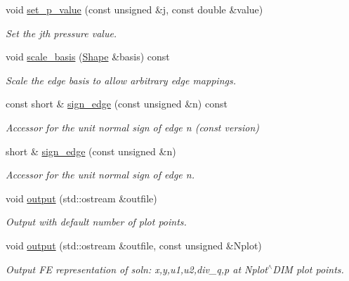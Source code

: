 \begin{DoxyCompactItemize}
void \hyperlink{classoomph_1_1TAxisymmetricPoroelasticityElement_a8156a72c0ba1887945532e528ff5173a}{set\+\_\+p\+\_\+value} (const unsigned \&j, const double \&value)
\begin{DoxyCompactList}\small\item\em Set the jth pressure value. \end{DoxyCompactList}\item 
void \hyperlink{classoomph_1_1TAxisymmetricPoroelasticityElement_ad06425b96b50c62a9e006ca7877cbb95}{scale\+\_\+basis} (\hyperlink{classoomph_1_1Shape}{Shape} \&basis) const
\begin{DoxyCompactList}\small\item\em Scale the edge basis to allow arbitrary edge mappings. \end{DoxyCompactList}\item 
const short \& \hyperlink{classoomph_1_1TAxisymmetricPoroelasticityElement_aa78f2091846d6ec114e2a75631b512d4}{sign\+\_\+edge} (const unsigned \&n) const
\begin{DoxyCompactList}\small\item\em Accessor for the unit normal sign of edge n (const version) \end{DoxyCompactList}\item 
short \& \hyperlink{classoomph_1_1TAxisymmetricPoroelasticityElement_a2f1338647177379af3d5cc4b9c552fb9}{sign\+\_\+edge} (const unsigned \&n)
\begin{DoxyCompactList}\small\item\em Accessor for the unit normal sign of edge n. \end{DoxyCompactList}\item 
void \hyperlink{classoomph_1_1TAxisymmetricPoroelasticityElement_ab7754062a0e98148d1a1bdf153353772}{output} (std\+::ostream \&outfile)
\begin{DoxyCompactList}\small\item\em Output with default number of plot points. \end{DoxyCompactList}\item 
void \hyperlink{classoomph_1_1TAxisymmetricPoroelasticityElement_a8a9f71d4757ccb3c1a172f080e2731ca}{output} (std\+::ostream \&outfile, const unsigned \&Nplot)
\begin{DoxyCompactList}\small\item\em Output FE representation of soln\+: x,y,u1,u2,div\+\_\+q,p at Nplot$^\wedge$\+D\+IM plot points. \end{DoxyCompactList}\item 

\end{DoxyCompactItemize}
